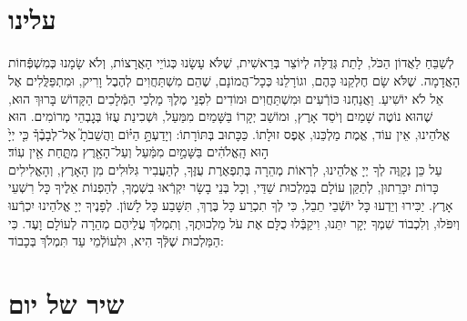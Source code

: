\documentclass[twoside, openany, parskip=half, 11pt]{book}
\begin{document}
 \uvaletzion
 
 \\
 \\


\label{end of shacharis}
\fullkaddish

\section*{ עלינו }

\newcommand{\aleinu}{
\firstword{עָלֵֽינוּ}
 לְשַׁבֵּחַ לַאֲדוֹן הַכֹּל, לָתֵת גְּדֻלָּה לְיוֹצֵר בְּרֵאשִׁית, שֶׁלֹּא עָשָׂנוּ כְּגוֹיֵי הָאֲרָצוֹת, וְלֹא שָׂמָנוּ כְּמִשְׁפְּֿחוֹת הָאֲדָמָה. שֶׁלֹּא שָׂם חֶלְקֵנוּ כָּהֶם, וגוֹרָלֵנוּ כְּכָל־הֲמוֹנָם, שֶׁהֵם מִשְׁתַּחֲוִים לְהֶבֶל וָרִיק, וּמִתְפַּלֲּלִים אֶל אֵל לֹא יוֹשִׁיעַ. וַאֲנַחְנוּ כּוֹרְֿעִים וּמִשְׁתַּחֲוִים וּמוֹדִים לִפְנֵי מֶלֶךְ מַלְכֵי הַמְּֿלָכִים הַקָּדוֹשׁ בָּרוּךְ הוּא, שֶׁהוּא נוֹטֶה שָׁמַיִם וְיֹסֵד אָרֶץ, וּמוֹשַׁב יְקָרוֹ בַּשָּׁמַיִם מִמַּעַל, וּשְׁכִינַת עֻזּוֹ בְּגׇבְהֵי מְרוֹמִים. הוּא אֱלֹהֵינוּ, אֵין עוֹד, אֱמֶת מַלְכֵּנוּ, אֶפֶס זוּלָתוֹ. כַּכָּתוּב בְּתּוֹרָתוֹ: וְיָדַעְתָּ֣
 \source{דברים ד}
  הַיּ֗וֹם וַהֲשֵׁבֹתָ֮ אֶל־לְבָבֶ֒ךָ֒ כִּ֤י יְיָ֙ ה֣וּא הָֽאֱלֹהִ֔ים בַּשָּׁמַ֣יִם מִמַּ֔עַל וְעַל־הָאָ֖רֶץ מִתָּ֑חַת אֵ֖ין עֽוֹד׃\\
עַל כֵּן נְקַוֶּה לְךָ יְיָ אֱלֹהֵינוּ, לִרְאוֹת מְהֵרָה בְּתִפְאֶרֶת עֻזֶּךָ, לְהַעֲבִיר גִּלּוּלִים מִן הָאָרֶץ, וְהָאֱלִילִים כָּרוֹת יִכָּרֵתוּן, לְתַקֵּן עוֹלָם בְּמַלְכוּת שַׁדַּי, וְכָל בְּנֵי בָשָׂר יִקְרְֿאוּ בִשְׁמֶךָ, לְהַפְנוֹת אֵלֶיךָ כָּל רִשְׁעֵי אָרֶץ. יַכִּירוּ וְיֵדְעוּ כָּל יוֹשְֿׁבֵי תֵבֵל, כִּי לְךָ תִכְרַע כָּל בֶּרֶךְ, תִּשָּׁבַע כָּל לָשׁוֹן. לְפָנֶיךָ יְיָ אֱלֹהֵינוּ יִכְרְֿעוּ וְיִפֹּלוּ, וְלִכְבוֹד שִׁמְךָ יְקָר יִתֵּנוּ, \adforn{14} וִיקַבְּֿלוּ כֻלָּם אֶת עֹל מַלְכוּתֶךָ, וְתִמְלֹךְ עֲלֵיהֶם מְהֵרָה לְעוֹלָם וָעֶד. כִּי הַמַּלְכוּת שֶׁלְּֿךָ הִיא, וּלְעוֹלְֿמֵי עַד תִּמְלֹךְ בְּכָבוֹד:
}

\aleinu


\section[שיר של יום]{ שיר של יום }
\label{shir_shel_yom}

\\
\vspace{-1.5\baselineskip}
\kafdalet
\end{document}
